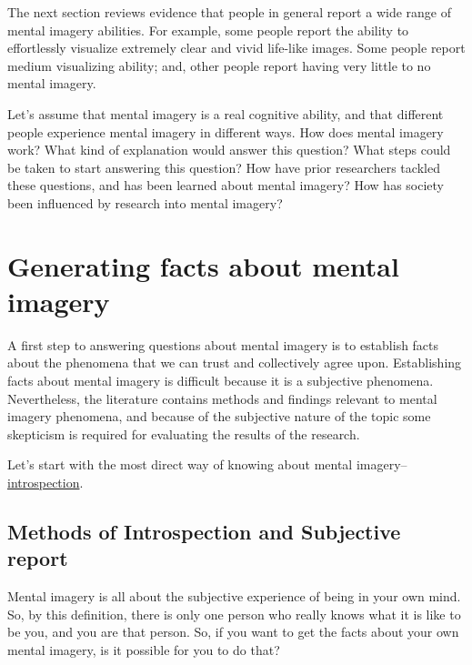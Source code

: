\documentclass[
  oneside,
  12pt]{crumpbook}
\begin{document}
The next section reviews evidence that people in general report a wide range of mental imagery abilities. For example, some people report the ability to effortlessly visualize extremely clear and vivid life-like images. Some people report medium visualizing ability; and, other people report having very little to no mental imagery.

Let's assume that mental imagery is a real cognitive ability, and that different people experience mental imagery in different ways. How does mental imagery work? What kind of explanation would answer this question? What steps could be taken to start answering this question? How have prior researchers tackled these questions, and has been learned about mental imagery? How has society been influenced by research into mental imagery?

\hypertarget{generating-facts-about-mental-imagery}{%
\section{Generating facts about mental imagery}\label{generating-facts-about-mental-imagery}}

A first step to answering questions about mental imagery is to establish facts about the phenomena that we can trust and collectively agree upon. Establishing facts about mental imagery is difficult because it is a subjective phenomena. Nevertheless, the literature contains methods and findings relevant to mental imagery phenomena, and because of the subjective nature of the topic some skepticism is required for evaluating the results of the research.

Let's start with the most direct way of knowing about mental imagery--\protect\hyperlink{gls-introspection}{introspection}.

\hypertarget{methods-of-introspection-and-subjective-report}{%
\subsection{Methods of Introspection and Subjective report}\label{methods-of-introspection-and-subjective-report}}

Mental imagery is all about the subjective experience of being in your own mind. So, by this definition, there is only one person who really knows what it is like to be you, and you are that person. So, if you want to get the facts about your own mental imagery, is it possible for you to do that?
\end{document}
